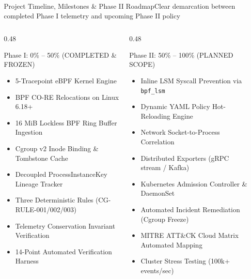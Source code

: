 \documentclass[aspectratio=169,10pt]{beamer}
\begin{document}
\begin{frame}{Project Timeline, Milestones \& Phase II Roadmap}{Clear demarcation between completed Phase I telemetry and upcoming Phase II policy}
  \begin{columns}[T]
    \begin{column}{0.48\textwidth}
      \begin{exampleblock}{Phase I: 0\% -- 50\% (COMPLETED \& FROZEN)}
        \scriptsize
        \begin{itemize}
          \item[$\checkmark$] 5-Tracepoint eBPF Kernel Engine
          \item[$\checkmark$] BPF CO-RE Relocations on Linux 6.18+
          \item[$\checkmark$] 16 MiB Lockless BPF Ring Buffer Ingestion
          \item[$\checkmark$] Cgroup v2 Inode Binding \& Tombstone Cache
          \item[$\checkmark$] Decoupled ProcessInstanceKey Lineage Tracker
          \item[$\checkmark$] Three Deterministic Rules (CG-RULE-001/002/003)
          \item[$\checkmark$] Telemetry Conservation Invariant Verification
          \item[$\checkmark$] 14-Point Automated Verification Harness
        \end{itemize}
      \end{exampleblock}
    \end{column}

    \begin{column}{0.48\textwidth}
      \begin{block}{Phase II: 50\% -- 100\% (PLANNED SCOPE)}
        \scriptsize
        \begin{itemize}
          \item[$\square$] Inline LSM Syscall Prevention via \texttt{bpf\_lsm}
          \item[$\square$] Dynamic YAML Policy Hot-Reloading Engine
          \item[$\square$] Network Socket-to-Process Correlation
          \item[$\square$] Distributed Exporters (gRPC stream / Kafka)
          \item[$\square$] Kubernetes Admission Controller \& DaemonSet
          \item[$\square$] Automated Incident Remediation (Cgroup Freeze)
          \item[$\square$] MITRE ATT\&CK Cloud Matrix Automated Mapping
          \item[$\square$] Cluster Stress Testing (100k+ events/sec)
        \end{itemize}
      \end{block}
    \end{column}
  \end{columns}
\end{frame}
\end{document}
